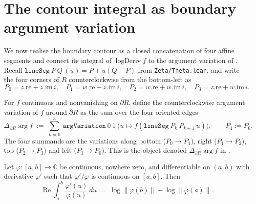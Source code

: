 \section{The contour integral as boundary argument variation}
\label{sec:ap_argvar}

We now realise the boundary contour as a closed concatenation of four affine
segments and connect its integral of $\operatorname{logDeriv} f$ to the argument
variation of . Recall $\texttt{lineSeg}\ P\ Q\ (u)=P+u(Q-P)$
from \texttt{Zeta/Theta.lean}, and write the four corners of $R$
counterclockwise from the bottom-left as
\[
  P_0=z.\mathrm{re}+z.\mathrm{im}\,i,\quad
  P_1=w.\mathrm{re}+z.\mathrm{im}\,i,\quad
  P_2=w.\mathrm{re}+w.\mathrm{im}\,i,\quad
  P_3=z.\mathrm{re}+w.\mathrm{im}\,i .
\]

\begin{definition}
\label{def:ap_rect_argvar}
\leanok
{}
For $f$ continuous and nonvanishing on $\partial R$, define the counterclockwise
argument variation of $f$ around $\partial R$ as the sum over the four oriented
edges
\[
  \Delta_{\partial R}\arg f \;:=\;
  \sum_{k=0}^{3}\ \texttt{argVariation}\ 0\ 1\ \bigl(u\mapsto f(\texttt{lineSeg}\
  P_k\ P_{k+1}\ u)\bigr),
  \qquad P_4:=P_0 .
\]
The four summands are the variations along bottom ($P_0\to P_1$), right
($P_1\to P_2$), top ($P_2\to P_3$) and left ($P_3\to P_0$). This is the object
denoted $\Delta_{\partial R}\arg f$ in \Cref{cha:n_formula}.
\end{definition}

\begin{lemma}
\label{lem:ap_re_integral}
\leanok
{}
Let $\varphi:[a,b]\to\mathbb C$ be continuous, nowhere zero, and differentiable on
$(a,b)$ with derivative $\varphi'$ such that $\varphi'/\varphi$ is continuous on
$[a,b]$. Then
\[
  \operatorname{Re}\!\int_a^b \frac{\varphi'(u)}{\varphi(u)}\,du
  \;=\; \log\lVert \varphi(b)\rVert - \log\lVert \varphi(a)\rVert .
\]
\end{lemma}

